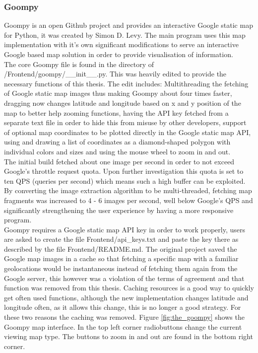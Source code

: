\subsubsection{Goompy}
Goompy\cite{goompy} is an open Github project and provides an interactive Google static map\cite{googleSM} for Python, it was created by Simon D. Levy. The main program uses this map implementation with it's own significant modifications to serve an interactive Google based map solution in order to provide visualisation of information.\\
The core Goompy file is found in the directory of /Frontend/goompy/\_\_init\_\_.py. This was heavily edited to provide the necessary functions of this thesis. The edit includes: Multithreading the fetching of Google static map images thus making Goompy about four times faster, dragging now changes latitude and longitude based on x and y position of the map to better help zooming functions, having the API key fetched from a separate text file in order to hide this from misuse by other developers, support of optional map coordinates to be plotted directly in the Google static map API, using and drawing a list of coordinates as a diamond-shaped polygon with individual colors and sizes and using the mouse wheel to zoom in and out.\\
The initial build fetched about one image per second in order to not exceed Google's throttle request quota. Upon further investigation this quota is set to ten QPS (queries per second) which means such a high buffer can be exploited. By converting the image extraction algorithm to be multi-threaded, fetching map fragments was increased to 4 - 6 images per second, well below Google's QPS and significantly strengthening the user experience by having a more responsive program.\\
Goompy requires a Google static map API key in order to work properly, users are asked to create the file Frontend/api\_keys.txt and paste the key there as described by the file Frontend/README.md. The original project saved the Google map images in a cache so that fetching a specific map with a familiar geolocations would be instantaneous instead of fetching them again from the Google server, this however was a violation of the terms of agreement and that function was removed from this thesis. Caching resources is a good way to quickly get often used functions, although the new implementation changes latitude and longitude often, as it allows this change, this is no longer a good strategy. For these two reasons the caching was removed.
Figure \ref{fig:the_goompy} shows the Goompy map interface. In the top left corner radiobuttons change the current viewing map type. The buttons to zoom in and out are found in the bottom right corner.

